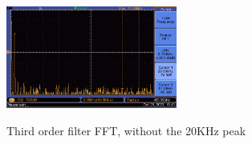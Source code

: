 \begin{figure}[H]
    \centering
    \includegraphics[width=0.5\textwidth]{images/execution_03_third_order_fft_20.png}
    \label{fig:execution_03_third_order_fft_20}
    \caption{Third order filter FFT, without the 20KHz peak}
\end{figure}



